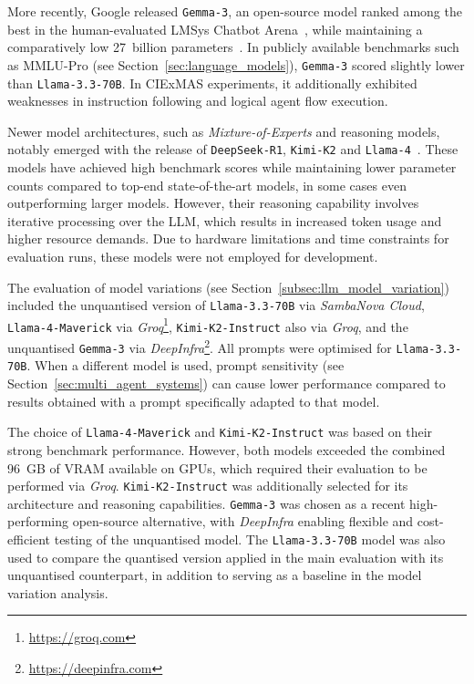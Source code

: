 \documentclass[a4paper,oneside,bibliography=totoc]{scrbook}
\begin{document}
More recently, Google released \texttt{Gemma-3}, an open-source model ranked among the best in the human-evaluated LMSys Chatbot Arena~\cite{Chiang2024}, while maintaining a comparatively low 27~billion parameters~\cite{Team2025}. In publicly available benchmarks such as MMLU-Pro (see Section~\ref{sec:language_models}), \texttt{Gemma-3} scored slightly lower than \texttt{Llama-3.3-70B}. In CIExMAS experiments, it additionally exhibited weaknesses in instruction following and logical agent flow execution.

Newer model architectures, such as \textit{Mixture-of-Experts} and reasoning models, notably emerged with the release of \texttt{DeepSeek-R1}, \texttt{Kimi-K2} and \texttt{Llama-4}~\cite{KimiTeam2025,DeepSeekAI2025,MetaAI2025}. These models have achieved high benchmark scores while maintaining lower parameter counts compared to top-end state-of-the-art models, in some cases even outperforming larger models. However, their reasoning capability involves iterative processing over the \ac{LLM}, which results in increased token usage and higher resource demands. Due to hardware limitations and time constraints for evaluation runs, these models were not employed for development.

The evaluation of model variations (see Section~\ref{subsec:llm_model_variation}) included the unquantised version of \texttt{Llama-3.3-70B} via \textit{SambaNova Cloud}, \texttt{Llama-4-Maverick} via \textit{Groq}\footnote{\url{https://groq.com}}, \texttt{Kimi-K2-\allowbreak Instruct} also via \textit{Groq}, and the unquantised \texttt{Gemma-3} via \textit{DeepInfra}\footnote{\url{https://deepinfra.com}}. All prompts were optimised for \texttt{Llama-3.3-70B}. When a different model is used, prompt sensitivity (see Section~\ref{sec:multi_agent_systems}) can cause lower performance compared to results obtained with a prompt specifically adapted to that model.

The choice of \texttt{Llama-4-Maverick} and \texttt{Kimi-K2-Instruct} was based on their strong benchmark performance. However, both models exceeded the combined 96~GB of VRAM available on GPUs, which required their evaluation to be performed via \textit{Groq}. \texttt{Kimi-K2-\allowbreak Instruct} was additionally selected for its architecture and reasoning capabilities. \linebreak[4]\texttt{Gemma-3} was chosen as a recent high-performing open-source alternative, with \textit{DeepInfra} enabling flexible and cost-efficient testing of the unquantised model. The \texttt{Llama-3.3-70B} model was also used to compare the quantised version applied in the main evaluation with its unquantised counterpart, in addition to serving as a baseline in the model variation analysis.
\end{document}
